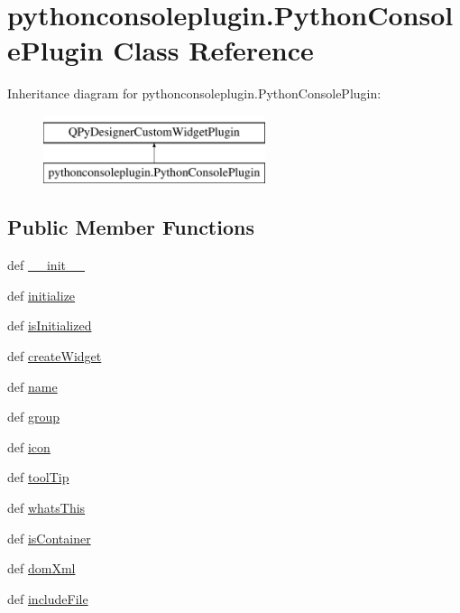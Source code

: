 \hypertarget{classpythonconsoleplugin_1_1PythonConsolePlugin}{}\section{pythonconsoleplugin.\+Python\+Console\+Plugin Class Reference}
\label{classpythonconsoleplugin_1_1PythonConsolePlugin}
Inheritance diagram for pythonconsoleplugin.\+Python\+Console\+Plugin\+:\begin{figure}[H]
\begin{center}
\leavevmode
\includegraphics[height=2.000000cm]{classpythonconsoleplugin_1_1PythonConsolePlugin}
\end{center}
\end{figure}
\subsection*{Public Member Functions}
\begin{DoxyCompactItemize}
\item 
def \hyperlink{classpythonconsoleplugin_1_1PythonConsolePlugin_abeb19cadc32dd3699c358a7df72bbd78}{\+\_\+\+\_\+init\+\_\+\+\_\+}
\item 
def \hyperlink{classpythonconsoleplugin_1_1PythonConsolePlugin_a4bffdcb58c2a21f2ffbddf5974676410}{initialize}
\item 
def \hyperlink{classpythonconsoleplugin_1_1PythonConsolePlugin_a5d13533e0ededc612e1e9f1aaf04c5f3}{is\+Initialized}
\item 
def \hyperlink{classpythonconsoleplugin_1_1PythonConsolePlugin_ab1aa30cf0d55b55f013e49ad02dbc7d6}{create\+Widget}
\item 
def \hyperlink{classpythonconsoleplugin_1_1PythonConsolePlugin_aa239d3465598e4036cc776efec3862f7}{name}
\item 
def \hyperlink{classpythonconsoleplugin_1_1PythonConsolePlugin_adc3fdd66d1f87f2f4966e33048d33ceb}{group}
\item 
def \hyperlink{classpythonconsoleplugin_1_1PythonConsolePlugin_aa75d90ff0c9a95acc2d0bff9e2e504b6}{icon}
\item 
def \hyperlink{classpythonconsoleplugin_1_1PythonConsolePlugin_a70f6f8f9f49411ee696f8e54cd3c4b97}{tool\+Tip}
\item 
def \hyperlink{classpythonconsoleplugin_1_1PythonConsolePlugin_ab80c4c5f571682e6bc6b86150bf2106e}{whats\+This}
\item 
def \hyperlink{classpythonconsoleplugin_1_1PythonConsolePlugin_a7ca7156fc514b490dca96242f4c01ea2}{is\+Container}
\item 
def \hyperlink{classpythonconsoleplugin_1_1PythonConsolePlugin_ae03ec805433d9b72e29baebb6ff7919f}{dom\+Xml}
\item 
def \hyperlink{classpythonconsoleplugin_1_1PythonConsolePlugin_a8ac9703e5d3dfa68f42d64786dc44226}{include\+File}
\end{DoxyCompactItemize}
